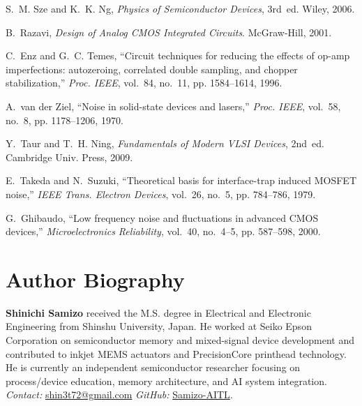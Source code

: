 \documentclass[conference]{IEEEtran}
\begin{document}
\begin{thebibliography}{10}

S.~M. Sze and K.~K. Ng, \emph{Physics of Semiconductor Devices}, 3rd~ed. Wiley, 2006.

B.~Razavi, \emph{Design of Analog CMOS Integrated Circuits}. McGraw-Hill, 2001.

C.~Enz and G.~C. Temes, ``Circuit techniques for reducing the effects of op-amp imperfections: autozeroing, correlated double sampling, and chopper stabilization,'' \emph{Proc. IEEE}, vol.~84, no.~11, pp. 1584--1614, 1996.

A.~van der Ziel, ``Noise in solid-state devices and lasers,'' \emph{Proc. IEEE}, vol.~58, no.~8, pp. 1178--1206, 1970.

Y.~Taur and T.~H. Ning, \emph{Fundamentals of Modern VLSI Devices}, 2nd~ed. Cambridge Univ. Press, 2009.

E.~Takeda and N.~Suzuki, ``Theoretical basis for interface-trap induced MOSFET noise,'' \emph{IEEE Trans. Electron Devices}, vol.~26, no.~5, pp. 784--786, 1979.

G.~Ghibaudo, ``Low frequency noise and fluctuations in advanced CMOS devices,'' \emph{Microelectronics Reliability}, vol.~40, no.~4--5, pp. 587--598, 2000.

\end{thebibliography}

\section*{Author Biography}
\textbf{Shinichi Samizo} received the M.S. degree in Electrical and Electronic Engineering from Shinshu University, Japan. He worked at Seiko Epson Corporation on semiconductor memory and mixed-signal device development and contributed to inkjet MEMS actuators and PrecisionCore printhead technology. He is currently an independent semiconductor researcher focusing on process/device education, memory architecture, and AI system integration.\\[2pt]
\emph{Contact:} \href{mailto:shin3t72@gmail.com}{shin3t72@gmail.com}\quad
\emph{GitHub:} \href{https://github.com/Samizo-AITL}{Samizo-AITL}.
\end{document}
